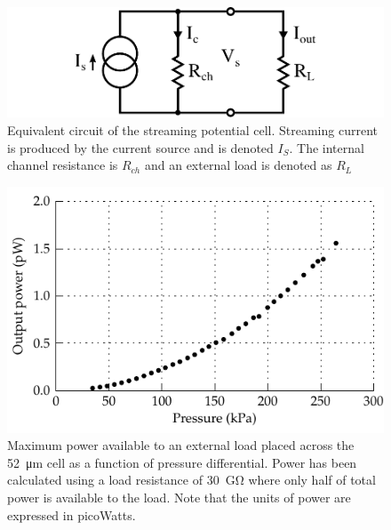 \documentclass[10pt,final,journal]{IEEEtran}
\begin{document}
    \begin{figure}
        \begin{center}
        \includegraphics[width=\linewidth]{StreamingCell_EquivalentCircuit}
        \end{center}
        \caption{Equivalent circuit of the streaming potential cell.
        Streaming current is produced by the current source and is denoted $I_{S}$.
        The internal channel resistance is $R_{ch}$ and an external load is denoted as $R_{L}$}
        \label{fig:equivalentCircuit}
    \end{figure}

    \begin{figure}
        \begin{center}
        \includegraphics[width=\linewidth]{graph_powerPressure}
        \end{center}
        \caption{Maximum power available to an external load placed across the \SI{52}{\micro\meter} cell as a function of pressure differential. Power has been calculated using a load resistance of \SI{30}{\giga\ohm} where only half of total power is available to the load. Note that the units of power are expressed in picoWatts.}
        \label{fig:cellPowerPressure}
    \end{figure}
\end{document}
